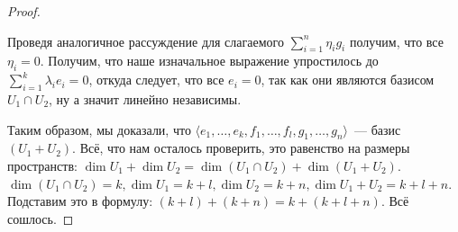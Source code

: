 \begin{proof}
\begin{enumerate}
            Проведя аналогичное рассуждение для слагаемого $\sum\limits_{i=1}^{n}\eta_ig_i$ получим, что все
            $\eta_i = 0$. Получим, что наше изначальное выражение упростилось до 
            $\sum\limits_{i=1}^{k}\lambda_ie_i = 0$, откуда следует, что все $e_i = 0$, так как они
            являются базисом $U_1\cap U_2$, ну а значит линейно независимы.
    \end{enumerate}
    Таким образом, мы доказали, что $\langle e_1,\dots,e_k,f_1,\dots,f_l,g_1,\dots,g_n\rangle$~---
    базис $(U_1 + U_2)$. Всё, что нам осталось проверить, это равенство на размеры пространств:
    $\dim U_1 + \dim U_2 = \dim(U_1 \cap U_2) + \dim(U_1 + U_2)$.
    $\dim (U_1\cap U_2) = k, \dim U_1 = k + l, \dim U_2 = k + n, \dim U_1 + U_2 = k + l + n$.
    Подставим это в формулу: $(k + l) + (k + n) = k + (k + l + n)$. Всё сошлось.
\end{proof}

